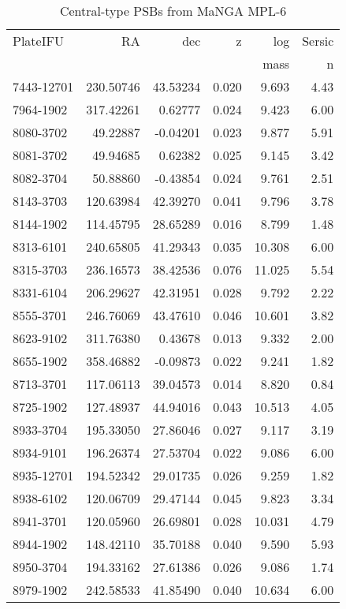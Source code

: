 \begin{table}[]
\caption{Central-type PSBs from MaNGA MPL-6}
\label{tab:my-CPSBs}
\begin{tabular}{lrrrrr}
\hline
PlateIFU & RA & dec & z & log & Sersic\\
& & & & mass & n \\
\hline
7443-12701 & 230.50746 & 43.53234 & 0.020 & 9.693 & 4.43 \\
7964-1902 & 317.42261 & 0.62777 & 0.024 & 9.423 & 6.00 \\
8080-3702 & 49.22887 & -0.04201 & 0.023 & 9.877 & 5.91 \\
8081-3702 & 49.94685 & 0.62382 & 0.025 & 9.145 & 3.42 \\
8082-3704 & 50.88860 & -0.43854 & 0.024 & 9.761 & 2.51 \\
8143-3703 & 120.63984 & 42.39270 & 0.041 & 9.796 & 3.78 \\
8144-1902 & 114.45795 & 28.65289 & 0.016 & 8.799 & 1.48 \\
8313-6101 & 240.65805 & 41.29343 & 0.035 & 10.308 & 6.00 \\
8315-3703 & 236.16573 & 38.42536 & 0.076 & 11.025 & 5.54 \\
8331-6104 & 206.29627 & 42.31951 & 0.028 & 9.792 & 2.22 \\
8555-3701 & 246.76069 & 43.47610 & 0.046 & 10.601 & 3.82 \\
8623-9102 & 311.76380 & 0.43678 & 0.013 & 9.332 & 2.00 \\
8655-1902 & 358.46882 & -0.09873 & 0.022 & 9.241 & 1.82 \\
8713-3701 & 117.06113 & 39.04573 & 0.014 & 8.820 & 0.84 \\
8725-1902 & 127.48937 & 44.94016 & 0.043 & 10.513 & 4.05 \\
8933-3704 & 195.33050 & 27.86046 & 0.027 & 9.117 & 3.19 \\
8934-9101 & 196.26374 & 27.53704 & 0.022 & 9.086 & 6.00 \\
8935-12701 & 194.52342 & 29.01735 & 0.026 & 9.259 & 1.82 \\
8938-6102 & 120.06709 & 29.47144 & 0.045 & 9.823 & 3.34 \\
8941-3701 & 120.05960 & 26.69801 & 0.028 & 10.031 & 4.79 \\
8944-1902 & 148.42110 & 35.70188 & 0.040 & 9.590 & 5.93 \\
8950-3704 & 194.33162 & 27.61386 & 0.026 & 9.086 & 1.74 \\
8979-1902 & 242.58533 & 41.85490 & 0.040 & 10.634 & 6.00 \\

\end{tabular}
\end{table}
